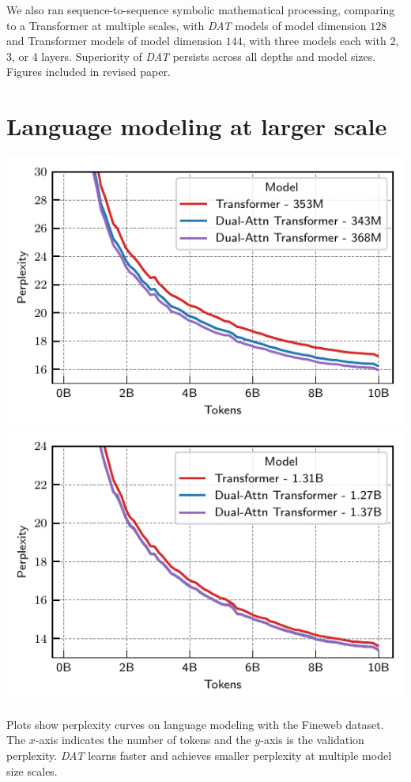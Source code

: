 \documentclass[a0,landscape,pdftex]{a0poster}
\begin{document}
\begin{minipage}{55cm}

We also ran sequence-to-sequence symbolic mathematical processing, comparing to a Transformer at multiple scales, with \textit{DAT} models of model dimension $128$ and Transformer models of model dimension $144$, with three models each with 2, 3, or 4 layers. Superiority of \textit{DAT} persists across all depths and model sizes. Figures included in revised paper.


\section*{Language modeling at larger scale}

\includegraphics[width=.50\textwidth]{../figs/experiments/fineweb/350M_scale_lm.pdf}
\includegraphics[width=.50\textwidth]{../figs/experiments/fineweb/1_3B_scale_lm.pdf}

Plots show perplexity curves on language modeling with the Fineweb dataset. The $x$-axis indicates the number of tokens and the $y$-axis is the validation perplexity. \textit{DAT} learns faster and achieves smaller perplexity at multiple model size scales.

\vskip2cm
\begin{center}

\end{center}

\end{minipage}
\end{document}
